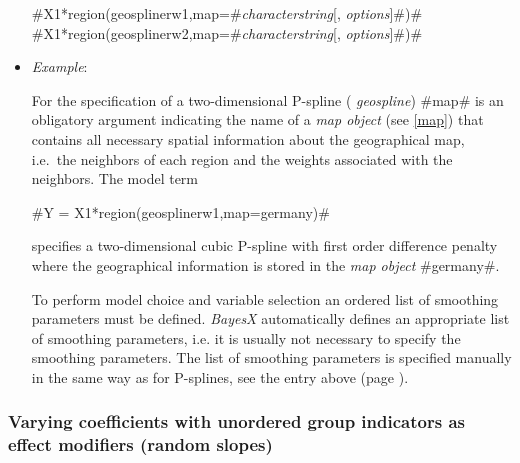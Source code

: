 \begin{itemize}
#X1*region(geosplinerw1,map=#{\em characterstring}[, {\em options}]#)# \\
#X1*region(geosplinerw2,map=#{\em characterstring}[, {\em options}]#)#
\item[] {\em Example}:

For the specification of a two-dimensional P-spline ({\em
geospline}) #map# is an obligatory argument indicating the name of
a {\em map object} (see \autoref{map}) that contains all necessary
spatial information about the geographical map, i.e.~the neighbors
of each region and the weights associated with the neighbors. The
model term

#Y = X1*region(geosplinerw1,map=germany)#

specifies a two-dimensional cubic P-spline with first order
difference penalty where the geographical information is stored in the
{\em map object} #germany#.

To perform model choice and variable selection an ordered list of smoothing parameters must be defined. {\em BayesX} automatically defines an appropriate list of smoothing
parameters, i.e. it is usually not necessary to  specify the smoothing parameters. The list of smoothing parameters is
specified manually in the same way as for P-splines, see the entry above (page \pageref{psplines_stepwise}).
\end{itemize}



\subsubsection*{Varying coefficients with unordered group indicators
as effect modifiers (random slopes)}


